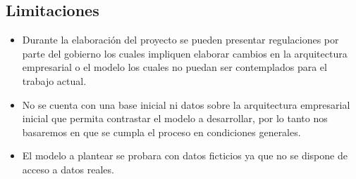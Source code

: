 \subsection{Limitaciones}
\begin{itemize}
\item Durante la elaboración del proyecto se pueden presentar regulaciones por parte del gobierno los cuales impliquen elaborar cambios en la arquitectura empresarial o el modelo los cuales no puedan ser contemplados para el trabajo actual.
\item No se cuenta con una base inicial ni datos sobre la arquitectura empresarial inicial que permita contrastar el modelo a desarrollar, por lo tanto nos basaremos en que se cumpla el proceso en condiciones generales.
\item El modelo a plantear se probara con datos ficticios ya que no se dispone de acceso a datos reales.
\end{itemize}


